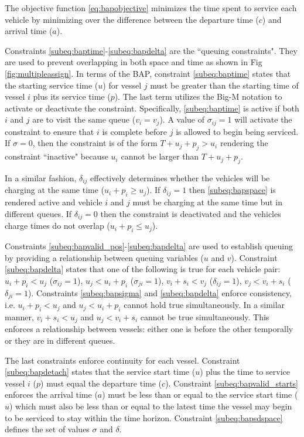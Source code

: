 \documentclass[letterpaper, 10pt, conference]{IEEEtran}
\begin{document}
The objective function \eqref{eq:bapobjective} minimizes the time spent to service each vehicle by minimizing over the difference between the departure time (\(c\)) and arrival time (\(a\)).

Constraints \ref{subeq:baptime}-\ref{subeq:bapdelta} are the ``queuing constraints". They are used to prevent overlapping in both space and time as shown in Fig \ref{fig:multipleassign}. In terms of the BAP, constraint \eqref{subeq:baptime} states that the starting service time (\(u\)) for vessel \(j\) must be greater than the starting time of vessel \(i\) plus its service time (\(p\)). The last term utilizes the Big-M notation to activate or deactivate the constraint. Specifically, \eqref{subeq:baptime} is active if both \(i\) and \(j\) are to visit the same queue (\(v_i = v_j\)). A value of \(\sigma_{ij} = 1\) will activate the constraint to ensure that \(i\) is complete before \(j\) is allowed to begin being serviced. If \(\sigma = 0\), then the constraint is of the form \(T + u_j + p_j > u_i\) rendering the constraint ``inactive" because \(u_i\) cannot be larger than \(T + u_j + p_j\).

In a similar fashion, \(\delta_{ij}\) effectively determines whether the vehicles will be charging at the same time (\(u_i + p_i \geq u_j\)). If \(\delta_{ij} = 1\) then \eqref{subeq:bapspace} is rendered active and vehicle \(i\) and \(j\) must be charging at the same time but in different queues. If \(\delta_{ij} = 0\) then the constraint is deactivated and the vehicles charge times do not overlap (\(u_i + p_i \leq u_j\)).

Constraints \ref{subeq:bapvalid_pos}-\ref{subeq:bapdelta} are used to establish queuing by providing a relationship between queuing variables (\(u\) and \(v\)). Constraint \eqref{subeq:bapdelta} states that one of the following is true for each vehicle pair: \(u_i + p_i < u_j\) (\(\sigma_{ij} = 1\)), \(u_j < u_i + p_i\) (\(\sigma_{ji} = 1\)), \(v_i + s_i < v_j\) (\(\delta_{ij} = 1\)), \(v_j < v_i + s_i\) (\(\delta_{ji} = 1\)). Constraints \eqref{subeq:bapsigma} and \eqref{subeq:bapdelta} enforce consistency, i.e. \(u_i + p_i < u_j\) and \(u_j < u_i + p_i\) cannot hold true simultaneously. In a similar manner, \(v_i + s_i < u_j\) and \(u_j < v_i + s_i\) cannot be true simultaneously. This enforces a relationship between vessels: either one is before the other temporally or they are in different queues.

The last constraints enforce continuity for each vessel. Constraint \eqref{subeq:bapdetach} states that the service start time (\(u\)) plus the time to service vessel \(i\) (\(p\)) must equal the departure time (\(c\)). Constraint \eqref{subeq:bapvalid_starts} enforces the arrival time (\(a\)) must be less than or equal to the service start time (\(u\)) which must also be less than or equal to the latest time the vessel may begin to be serviced to stay within the time horizon. Constraint \eqref{subeq:bapsdspace} defines the set of values \(\sigma\) and \(\delta\).
\end{document}
